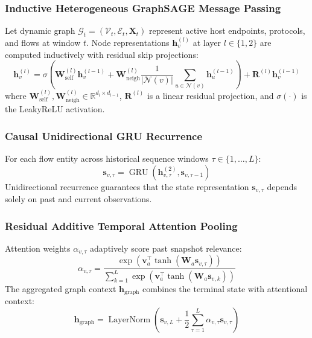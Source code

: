 \documentclass[11pt,a4paper]{article}
\begin{document}
\subsubsection{Inductive Heterogeneous GraphSAGE Message Passing}
Let dynamic graph $\mathcal{G}_t = (\mathcal{V}_t, \mathcal{E}_t, \mathbf{X}_t)$ represent active host endpoints, protocols, and flows at window $t$. Node representations $\mathbf{h}_v^{(l)}$ at layer $l \in \{1, 2\}$ are computed inductively with residual skip projections:
\begin{equation}
\mathbf{h}_{v}^{(l)} = \sigma \left( \mathbf{W}_{\text{self}}^{(l)} \mathbf{h}_{v}^{(l-1)} + \mathbf{W}_{\text{neigh}}^{(l)} \frac{1}{|\mathcal{N}(v)|} \sum_{u \in \mathcal{N}(v)} \mathbf{h}_{u}^{(l-1)} \right) + \mathbf{R}^{(l)} \mathbf{h}_{v}^{(l-1)}
\end{equation}
where $\mathbf{W}_{\text{self}}^{(l)}, \mathbf{W}_{\text{neigh}}^{(l)} \in \mathbb{R}^{d_{l} \times d_{l-1}}$, $\mathbf{R}^{(l)}$ is a linear residual projection, and $\sigma(\cdot)$ is the LeakyReLU activation.

\subsubsection{Causal Unidirectional GRU Recurrence}
For each flow entity across historical sequence windows $\tau \in \{1, \dots, L\}$:
\begin{equation}
\mathbf{s}_{v, \tau} = \operatorname{GRU}\left(\mathbf{h}_{v, \tau}^{(2)}, \mathbf{s}_{v, \tau-1}\right)
\end{equation}
Unidirectional recurrence guarantees that the state representation $\mathbf{s}_{v, \tau}$ depends solely on past and current observations.

\subsubsection{Residual Additive Temporal Attention Pooling}
Attention weights $\alpha_{v, \tau}$ adaptively score past snapshot relevance:
\begin{equation}
\alpha_{v, \tau} = \frac{\exp\left(\mathbf{v}_a^\top \tanh(\mathbf{W}_a \mathbf{s}_{v, \tau})\right)}{\sum_{k=1}^L \exp\left(\mathbf{v}_a^\top \tanh(\mathbf{W}_a \mathbf{s}_{v, k})\right)}
\end{equation}
The aggregated graph context $\mathbf{h}_{\text{graph}}$ combines the terminal state with attentional context:
\begin{equation}
\mathbf{h}_{\text{graph}} = \operatorname{LayerNorm}\left(\mathbf{s}_{v, L} + \frac{1}{2}\sum_{\tau=1}^L \alpha_{v, \tau} \mathbf{s}_{v, \tau}\right)
\end{equation}
\end{document}
